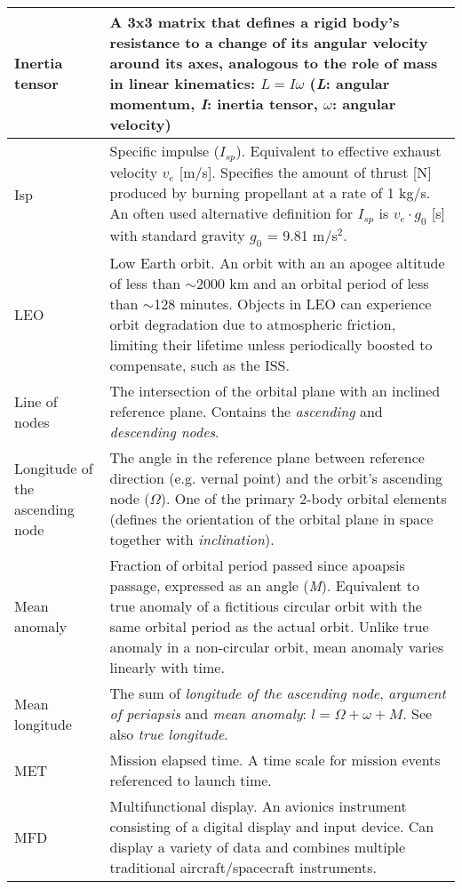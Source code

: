 \documentclass[Orbiter User Manual.tex]{subfiles}
\begin{document}
\begin{longtable}{ |p{}|p{}| }
	\hline\rule{0pt}{2ex}
	Inertia tensor & A 3x3 matrix that defines a rigid body's resistance to a change of its angular velocity around its axes, analogous to the role of mass in linear kinematics:\newline
	$L = I\omega$ (\textit{L}: angular momentum, \textit{I}: inertia tensor, $\omega$: angular velocity)\\
	\hline\rule{0pt}{2ex}
	Isp & Specific impulse ($I_{sp}$). Equivalent to effective exhaust velocity $v_{e}$ [m/s]. Specifies the amount of thrust [N] produced by burning propellant at a rate of 1 kg/s. An often used alternative definition for $I_{sp}$ is $v_{e} \cdot g_{0}$ [s] with standard gravity $g_{0}$ = 9.81 m/s$^{2}$.\\
	\hline\rule{0pt}{2ex}
	LEO & Low Earth orbit. An orbit with an an apogee altitude of less than $\sim$2000 km and an orbital period of less than $\sim$128 minutes. Objects in LEO can experience orbit degradation due to atmospheric friction, limiting their lifetime unless periodically boosted to compensate, such as the ISS.\\
	\hline\rule{0pt}{2ex}
	Line of nodes & The intersection of the orbital plane with an inclined reference plane. Contains the \textit{ascending} and \textit{descending nodes}.\\
	\hline\rule{0pt}{2ex}
	Longitude of the ascending node & The angle in the reference plane between reference direction (e.g. vernal point) and the orbit's ascending node ($\Omega$). One of the primary 2-body orbital elements (defines the orientation of the orbital plane in space together with \textit{inclination}).\\
	\hline\rule{0pt}{2ex}
	Mean anomaly & Fraction of orbital period passed since apoapsis passage, expressed as an angle (\textit{M}). Equivalent to true anomaly of a fictitious circular orbit with the same orbital period as the actual orbit. Unlike true anomaly in a non-circular orbit, mean anomaly varies linearly with time.\\
	\hline\rule{0pt}{2ex}
	Mean longitude & The sum of \textit{longitude of the ascending node}, \textit{argument of periapsis} and \textit{mean anomaly}: $l = \Omega + \omega + M$. See also \textit{true longitude}.\\
	\hline\rule{0pt}{2ex}
	MET & Mission elapsed time. A time scale for mission events referenced to launch time. \\
	\hline\rule{0pt}{2ex}
	MFD & Multifunctional display. An avionics instrument consisting of a digital display and input device. Can display a variety of data and combines multiple traditional aircraft/spacecraft instruments.\\

\end{longtable}
\end{document}
